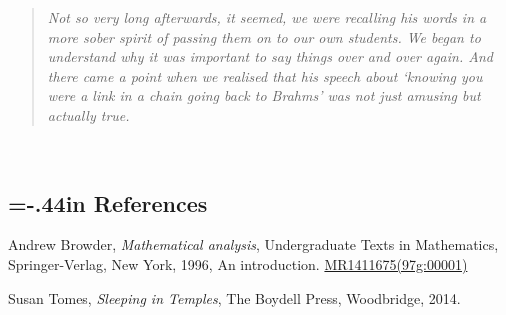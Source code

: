\documentclass{rs}
\theoremstyle{definition}
\theoremstyle{remark}
\renewcommand{\=}{\approx}
\renewcommand{\-}{\sim}
\newcommand{\wt}[1]{\textcolor{white}{#1} \!~}
\numberwithin{equation}{section}
\begin{document}
\begin{quote}
 \em Not so very long afterwards, it seemed, we were recalling his words in a 
 more sober spirit of passing them on to our own students.  We began to 
 understand why it was important to say things over and over again.  And there 
 came a point when we realised that his speech about `knowing you were a link in 
 a chain going back to Brahms' was not just amusing but actually true.  
\end{quote}



% 
% 

\vspace{.3in}
\renewcommand\refname{}
\newcommand{\AX}[1]{\href{http://arxiv.org/abs/#1}{arXiv:#1}}
\newcommand{\MRn}[2]{\href{http://www.ams.org/mathscinet-getitem?mr=#1}{MR#1#2}}
\wt{.}\vspace{-1.04in}
\begin{thebibliography}

\section*{\leftskip=-.44in References \vspace{.17in}}

Andrew Browder, \emph{Mathematical analysis}, Undergraduate Texts in
  Mathematics, Springer-Verlag, New York, 1996, An introduction. 
  \MRn{1411675}{(97g:00001)}

Susan Tomes, \emph{Sleeping in Temples}, The Boydell Press, Woodbridge, 2014.

\end{thebibliography}
\end{document}
